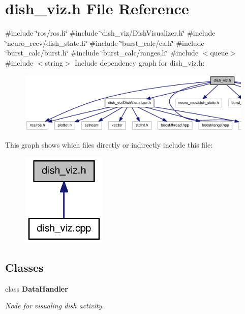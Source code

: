 \section{dish\-\_\-viz.\-h \-File \-Reference}
\label{dish__viz_8h}
{\ttfamily \#include \char`\"{}ros/ros.\-h\char`\"{}}\*
{\ttfamily \#include \char`\"{}dish\-\_\-viz/\-Dish\-Visualizer.\-h\char`\"{}}\*
{\ttfamily \#include \char`\"{}neuro\-\_\-recv/dish\-\_\-state.\-h\char`\"{}}\*
{\ttfamily \#include \char`\"{}burst\-\_\-calc/ca.\-h\char`\"{}}\*
{\ttfamily \#include \char`\"{}burst\-\_\-calc/burst.\-h\char`\"{}}\*
{\ttfamily \#include \char`\"{}burst\-\_\-calc/ranges.\-h\char`\"{}}\*
{\ttfamily \#include $<$queue$>$}\*
{\ttfamily \#include $<$string$>$}\*
\-Include dependency graph for dish\-\_\-viz.\-h\-:\nopagebreak
\begin{figure}[H]
\begin{center}
\leavevmode
\includegraphics[width=350pt]{dish__viz_8h__incl}
\end{center}
\end{figure}
\-This graph shows which files directly or indirectly include this file\-:\nopagebreak
\begin{figure}[H]
\begin{center}
\leavevmode
\includegraphics[width=114pt]{dish__viz_8h__dep__incl}
\end{center}
\end{figure}
\subsection*{\-Classes}
\begin{DoxyCompactItemize}
\item 
class {\bf \-Data\-Handler}
\begin{DoxyCompactList}\small\item\em \-Node for visualing dish activity. \end{DoxyCompactList}\end{DoxyCompactItemize}
